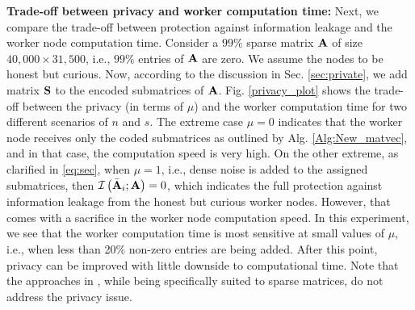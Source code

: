 
\vspace{0.02 in}

{\bf Trade-off between privacy and worker computation time:} 
Next, we compare the trade-off between protection against information leakage and the worker node computation time. Consider a $99\%$ sparse matrix $\mathbf{A}$ of size $40,000 \times 31,500$, i.e., $99\%$ entries of $\mathbf{A}$ are zero. We assume the nodes to be honest but curious. Now, according to the discussion in Sec. \ref{sec:private}, we add matrix $\mathbf{S}$ to the encoded submatrices of $\mathbf{A}$. %
Fig. \ref{privacy_plot} shows the trade-off between the privacy (in terms of $\mu$) and the worker computation time for two different scenarios of $n$ and $s$. The extreme case $\mu = 0$ indicates that the worker node receives only the coded submatrices as outlined by Alg. \ref{Alg:New_matvec}, and in that case, the computation speed is very high. On the other extreme, as clarified in \eqref{eq:sec}, when $\mu = 1$, i.e., dense noise is added to the assigned submatrices, then $\mathcal{I}\left(\bar{\mathbf{A}}_i; \mathbf{A} \right) = 0$, which indicates the full protection against information leakage from the honest but curious worker nodes. However, that comes with a sacrifice in the worker node computation speed. In this experiment, we see that the worker computation time is most sensitive at small values of $\mu$, i.e., when less than 20\% non-zero entries are being added. After this point, privacy can be improved with little downside to computational time. Note that the approaches in \cite{das2020coded, dasunifiedtreatment}, while being specifically suited to sparse matrices, do not address the privacy issue.
 

